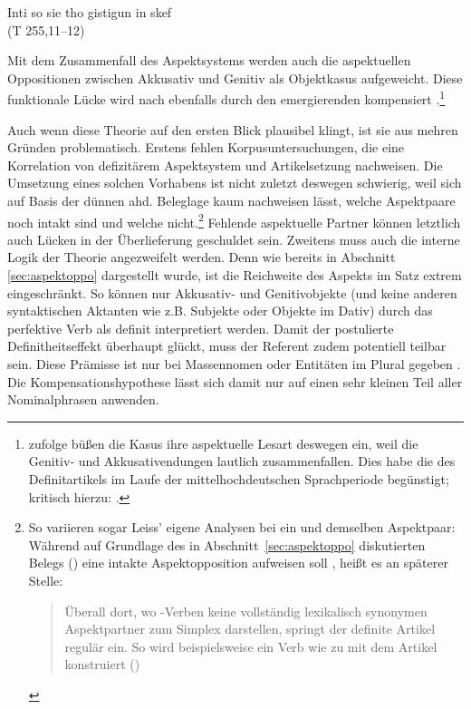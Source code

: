 \begin{exe}
	\ex \label{ex:bilan} Inti so sie tho gistigun in skef   \\   (T 255,11--12)
\end{exe}
\noindent
Mit dem Zusammenfall des Aspektsystems  werden auch die aspektuellen Oppositionen  zwischen Akkusativ und Genitiv als Objektkasus  aufgeweicht. Diese funktionale Lücke wird nach \textcite[187--193]{Leiss2000} ebenfalls durch den emergierenden  kompensiert \parencite[vgl. auch][46--47]{Abraham1997}.\footnote{\textcite[88--89]{Philippi1997} zufolge büßen die Kasus  ihre aspektuelle Lesart  deswegen ein, weil die Genitiv- und Akkusativendungen  lautlich zusammenfallen. Dies habe die  des Definitartikels  im Laufe der mittelhochdeutschen Sprachperiode begünstigt; kritisch hierzu: \textcite[234--235]{Lyons1999}.}

Auch wenn diese Theorie auf den ersten Blick plausibel klingt, ist sie aus mehren Gründen problematisch. Erstens fehlen  Korpusuntersuchungen, die eine Korrelation von defizitärem Aspektsystem  und Artikelsetzung nachweisen. Die Umsetzung eines solchen Vorhabens ist nicht zuletzt deswegen schwierig, weil sich auf Basis der dünnen ahd. Beleglage kaum nachweisen lässt, welche Aspektpaare  noch intakt sind und welche nicht.\footnote{So variieren sogar Leiss' eigene Analysen bei ein und demselben  Aspektpaar: Während  auf Grundlage des in Abschnitt~\ref{sec:aspektoppo} diskutierten Belegs () eine intakte Aspektopposition  aufweisen soll \parencite[171]{Leiss2000}, heißt es an späterer Stelle: \blockcquote[182]{Leiss2000}{Überall dort, wo -Verben keine vollständig lexikalisch synonymen Aspektpartner  zum Simplex darstellen, springt der definite Artikel regulär ein. So wird beispielsweise ein Verb wie   zu   mit dem Artikel konstruiert ()}.} Fehlende aspektuelle  Partner können letztlich auch Lücken in der Überlieferung geschuldet sein. Zweitens muss auch die interne Logik der Theorie angezweifelt werden. Denn wie bereits in Abschnitt \ref{sec:aspektoppo} dargestellt wurde, ist die Reichweite des Aspekts  im Satz extrem eingeschränkt. So können nur Akkusativ- und Genitivobjekte  (und keine anderen syntaktischen Aktanten wie z.B. Subjekte  oder Objekte  im Dativ) durch das perfektive  Verb als definit interpretiert werden. Damit der postulierte Definitheitseffekt  überhaupt glückt, muss der Referent zudem potentiell teilbar sein. Diese Prämisse ist nur bei Massennomen  oder Entitäten im Plural gegeben \parencite{Heindl2016}. Die Kompensationshypothese lässt sich damit nur auf einen sehr kleinen Teil aller Nominalphrasen  anwenden. 

